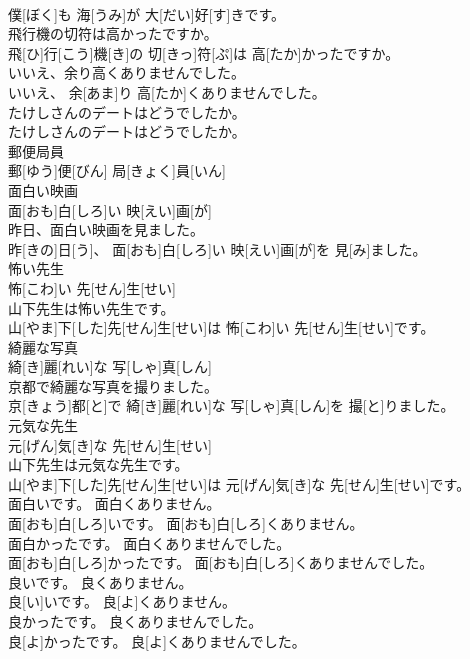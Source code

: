 \documentclass[8pt]{extreport}
\begin{document}
\begin{CJK}{UTF8}{min}
\\	僕[ぼく]も 海[うみ]が 大[だい]好[す]きです。
\\	飛行機の切符は高かったですか。	
\\	飛[ひ]行[こう]機[き]の 切[きっ]符[ぷ]は 高[たか]かったですか。
\\	いいえ、余り高くありませんでした。	
\\	いいえ、 余[あま]り 高[たか]くありませんでした。
\\	たけしさんのデートはどうでしたか。	
\\	たけしさんのデートはどうでしたか。
\\	郵便局員	
\\	郵[ゆう]便[びん] 局[きょく]員[いん]	
\\	面白い映画	
\\	面[おも]白[しろ]い 映[えい]画[が]
\\	昨日、面白い映画を見ました。	
\\	昨[きの]日[う]、 面[おも]白[しろ]い 映[えい]画[が]を 見[み]ました。
\\	怖い先生	
\\	怖[こわ]い 先[せん]生[せい]
\\	山下先生は怖い先生です。	
\\	山[やま]下[した]先[せん]生[せい]は 怖[こわ]い 先[せん]生[せい]です。
\\	綺麗な写真	
\\	綺[き]麗[れい]な 写[しゃ]真[しん]
\\	京都で綺麗な写真を撮りました。	
\\	京[きょう]都[と]で 綺[き]麗[れい]な 写[しゃ]真[しん]を 撮[と]りました。
\\	元気な先生	
\\	元[げん]気[き]な 先[せん]生[せい]
\\	山下先生は元気な先生です。	
\\	山[やま]下[した]先[せん]生[せい]は 元[げん]気[き]な 先[せん]生[せい]です。
\\	面白いです。 面白くありません。	
\\	面[おも]白[しろ]いです。 面[おも]白[しろ]くありません。
\\	面白かったです。 面白くありませんでした。	
\\	面[おも]白[しろ]かったです。 面[おも]白[しろ]くありませんでした。
\\	良いです。 良くありません。	
\\	良[い]いです。 良[よ]くありません。
\\	良かったです。 良くありませんでした。	
\\	良[よ]かったです。 良[よ]くありませんでした。

\end{CJK}
\end{document}
